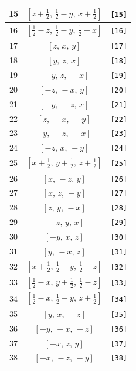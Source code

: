 \documentclass[fleqn,8pt]{jsarticle}
\begin{document}
\begin{longtable}{ccc}
15 & $\left[ z + \frac{1}{2},\, \frac{1}{2} - y,\, x + \frac{1}{2} \right]$ & {\tt [15]} \\ \hline
16 & $\left[ \frac{1}{2} - z,\, \frac{1}{2} - y,\, \frac{1}{2} - x \right]$ & {\tt [16]} \\ \hline
17 & $\left[ z,\, x,\, y \right]$ & {\tt [17]} \\ \hline
18 & $\left[ y,\, z,\, x \right]$ & {\tt [18]} \\ \hline
19 & $\left[ - y,\, z,\, - x \right]$ & {\tt [19]} \\ \hline
20 & $\left[ - z,\, - x,\, y \right]$ & {\tt [20]} \\ \hline
21 & $\left[ - y,\, - z,\, x \right]$ & {\tt [21]} \\ \hline
22 & $\left[ z,\, - x,\, - y \right]$ & {\tt [22]} \\ \hline
23 & $\left[ y,\, - z,\, - x \right]$ & {\tt [23]} \\ \hline
24 & $\left[ - z,\, x,\, - y \right]$ & {\tt [24]} \\ \hline
25 & $\left[ x + \frac{1}{2},\, y + \frac{1}{2},\, z + \frac{1}{2} \right]$ & {\tt [25]} \\ \hline
26 & $\left[ x,\, - z,\, y \right]$ & {\tt [26]} \\ \hline
27 & $\left[ x,\, z,\, - y \right]$ & {\tt [27]} \\ \hline
28 & $\left[ z,\, y,\, - x \right]$ & {\tt [28]} \\ \hline
29 & $\left[ - z,\, y,\, x \right]$ & {\tt [29]} \\ \hline
30 & $\left[ - y,\, x,\, z \right]$ & {\tt [30]} \\ \hline
31 & $\left[ y,\, - x,\, z \right]$ & {\tt [31]} \\ \hline
32 & $\left[ x + \frac{1}{2},\, \frac{1}{2} - y,\, \frac{1}{2} - z \right]$ & {\tt [32]} \\ \hline
33 & $\left[ \frac{1}{2} - x,\, y + \frac{1}{2},\, \frac{1}{2} - z \right]$ & {\tt [33]} \\ \hline
34 & $\left[ \frac{1}{2} - x,\, \frac{1}{2} - y,\, z + \frac{1}{2} \right]$ & {\tt [34]} \\ \hline
35 & $\left[ y,\, x,\, - z \right]$ & {\tt [35]} \\ \hline
36 & $\left[ - y,\, - x,\, - z \right]$ & {\tt [36]} \\ \hline
37 & $\left[ - x,\, z,\, y \right]$ & {\tt [37]} \\ \hline
38 & $\left[ - x,\, - z,\, - y \right]$ & {\tt [38]} \\ \hline

\end{longtable}
\end{document}
